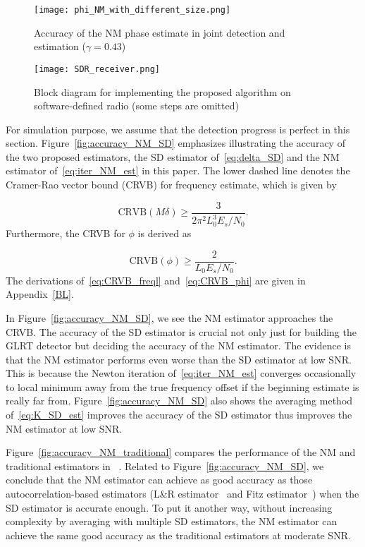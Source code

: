 \begin{figure}[t]
    \centerline{\texttt{[image: phi\_NM\_with\_different\_size.png]}}
    \caption{Accuracy of the NM phase estimate in joint detection and estimation ($\gamma=0.43$)}
    \label{fig:accuracy_phi_NM_joint}
    \end{figure}

\begin{figure*}[t]
    \centerline{\texttt{[image: SDR\_receiver.png]}}
    \caption{Block diagram for implementing the proposed algorithm on software-defined radio (some steps are omitted)}
    \label{fig:SDR_receiver}
    \end{figure*}

For simulation purpose, we assume that the detection pro\-gress is perfect in this section.
Figure~\ref{fig:accuracy_NM_SD} emphasizes illustrating the accuracy of the two proposed estimators, 
the SD estimator of~\eqref{eq:delta_SD} and the NM estimator of~\eqref{eq:iter_NM_est} in this paper.
The lower dashed line denotes the Cramer-Rao vector bound (CRVB) for frequency estimate, which is given by

\begin{equation}
    \label{eq:CRVB_freql}
    \text{CRVB}(M\delta) \geq \frac{3}{2\pi^{2}L_{0}^3E_s/N_{0}}.
  \end{equation}
Furthermore, the CRVB for $\phi$ is derived as

\begin{equation}
    \label{eq:CRVB_phi}
    \text{CRVB}(\phi) \geq \frac{2}{L_{0}E_s/N_{0}}.
  \end{equation}
The derivations of~\eqref{eq:CRVB_freql} and~\eqref{eq:CRVB_phi} are given in Appendix~\ref{BL}.

In Figure~\ref{fig:accuracy_NM_SD}, we see the NM estimator approaches the CRVB. The accuracy of the SD estimator is crucial
not only just for building the GLRT detector but deciding the accuracy of the NM estimator.
The evidence is that the NM estimator performs even worse than the SD estimator at low SNR.
This is because the Newton iteration of~\eqref{eq:iter_NM_est} converges occasionally to local
minimum away from the true frequency offset if the beginning estimate is really far from. Figure~\ref{fig:accuracy_NM_SD} also shows the averaging method of~\eqref{eq:K_SD_est}
improves the accuracy of the SD estimator thus improves the NM estimator at low SNR.

Figure~\ref{fig:accuracy_NM_traditional} compares the performance of the NM and traditional estimators in ~\cite{Kay_89,Luise_Reggiannini_95,Fitz_94}.
Related to Figure~\ref{fig:accuracy_NM_SD}, we conclude that the NM estimator can achieve as good accuracy as those autocorrelation-based estimators 
(L\&R estimator~\cite{Luise_Reggiannini_95} and Fitz estimator~\cite{Fitz_94})
when the SD estimator is accurate enough. To put it another way, without increasing complexity by averaging with multiple SD estimators, 
the NM estimator can achieve the same good accuracy as the traditional estimators at moderate SNR.

